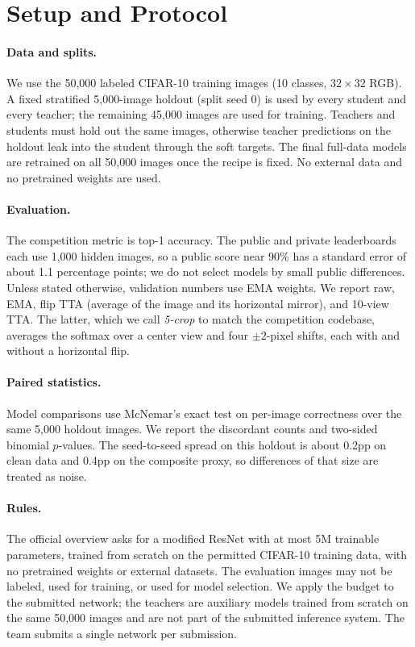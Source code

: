 \section{Setup and Protocol}
\label{sec:setup}

\paragraph{Data and splits.}
We use the 50,000 labeled CIFAR-10 training images (10 classes, $32\times32$
RGB). A fixed stratified 5,000-image holdout (split seed 0) is used by every
student and every teacher; the remaining 45,000 images are used for training.
Teachers and students must hold out the same images, otherwise teacher
predictions on the holdout leak into the student through the soft targets. The
final full-data models are retrained on all 50,000 images once the recipe is
fixed. No external data and no pretrained weights are used.

\paragraph{Evaluation.}
The competition metric is top-1 accuracy. The public and private leaderboards each
use 1,000 hidden images, so a public score near 90\% has a standard error of about
1.1 percentage points; we do not select models by small public differences. Unless
stated otherwise, validation numbers use EMA weights. We report raw, EMA, flip
TTA (average of the image and its horizontal mirror), and 10-view TTA. The latter,
which we call \emph{5-crop} to match the competition codebase, averages the
softmax over a center view and four $\pm2$-pixel shifts, each with and without a
horizontal flip.

\paragraph{Paired statistics.}
Model comparisons use McNemar's exact test on per-image correctness over the same
5,000 holdout images. We report the discordant counts and two-sided binomial
$p$-values. The seed-to-seed spread on this holdout is about 0.2pp on clean data
and 0.4pp on the composite proxy, so differences of that size are treated as
noise.

\paragraph{Rules.}
The official overview asks for a modified ResNet with at most 5M trainable
parameters, trained from scratch on the permitted CIFAR-10 training data, with no
pretrained weights or external datasets. The evaluation images may not be
labeled, used for training, or used for model selection. We apply the budget to
the submitted network; the teachers are auxiliary models trained from scratch on
the same 50,000 images and are not part of the submitted inference system. The
team submits a single network per submission.

